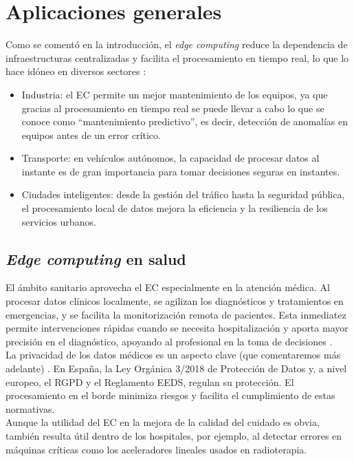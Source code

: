 \documentclass[twoside, 12pt]{opticajnl}
\begin{document}
\section{Aplicaciones generales}

Como se comentó en la introducción, el \textit{edge computing} reduce la dependencia de infraestructuras centralizadas y facilita el procesamiento en tiempo real, lo que lo hace idóneo en diversos sectores :
\begin{itemize}
    \item Industria: el EC permite un mejor mantenimiento de los equipos, ya que gracias al procesamiento en tiempo real se puede llevar a cabo lo que se conoce como ``mantenimiento predictivo'', es decir, detección de anomalías en equipos antes de un error crítico. 
    \item Transporte: en vehículos autónomos, la capacidad de procesar datos al instante es de gran importancia para tomar decisiones seguras en instantes.
    \item Ciudades inteligentes: desde la gestión del tráfico hasta la seguridad pública, el procesamiento local de datos mejora la eficiencia y la resiliencia de los servicios urbanos.
\end{itemize}

\subsection{\textit{Edge computing} en salud} \label{subsec2a}

El ámbito sanitario aprovecha el EC especialmente en la atención médica. Al procesar datos clínicos localmente, se agilizan los diagnósticos y tratamientos en emergencias, y se facilita la monitorización remota de pacientes. Esta inmediatez permite intervenciones rápidas cuando se necesita hospitalización y aporta mayor precisión en el diagnóstico, apoyando al profesional en la toma de decisiones . \\

La privacidad de los datos médicos es un aspecto clave (que comentaremos más adelante) . En España, la Ley Orgánica 3/2018 de Protección de Datos y, a nivel europeo, el RGPD y el Reglamento EEDS, regulan su protección. El procesamiento en el borde minimiza riesgos y facilita el cumplimiento de estas normativas. \\

Aunque la utilidad del EC en la mejora de la calidad del cuidado es obvia, también resulta útil dentro de los hospitales, por ejemplo, al detectar errores en máquinas críticas como los aceleradores lineales usados en radioterapia.
\end{document}
